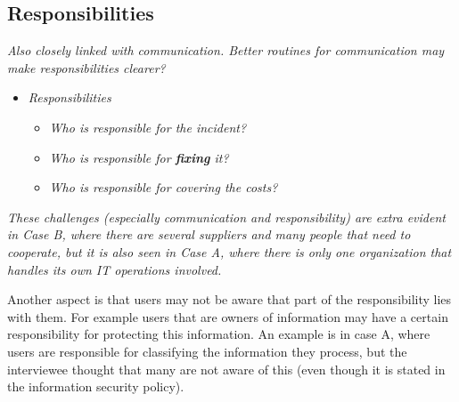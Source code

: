 \subsection{Responsibilities}
\textit{Also closely linked with communication. Better routines for communication may make responsibilities clearer?}

\begin{itemize}
\item \textit{Responsibilities}
\begin{itemize}
\item \textit{Who is responsible for the incident?}
\item \textit{Who is responsible for \textbf{fixing} it?}
\item \textit{Who is responsible for covering the costs?}
\end{itemize}
\end{itemize}

\textit{These challenges (especially communication and responsibility) are extra evident in Case B, where there are several suppliers and many people that need to cooperate, but it is also seen in Case A, where there is only one organization that handles its own IT operations involved.}

Another aspect is that users may not be aware that part of the responsibility lies with them. For example users that are owners of information may have a certain responsibility for protecting this information. An example is in case A, where users are responsible for classifying the information they process, but the interviewee thought that many are not aware of this (even though it is stated in the information security policy).

